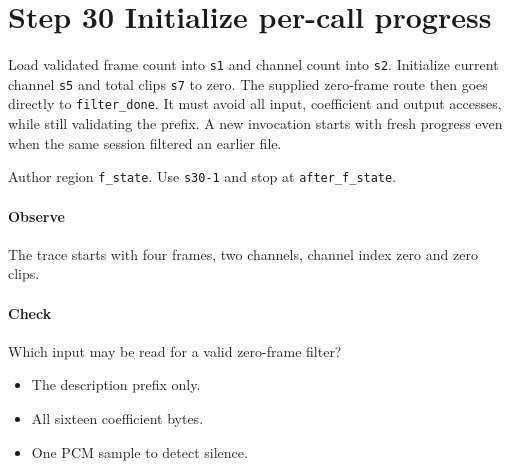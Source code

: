 \section{Step 30 Initialize per-call progress}\label{pcm-wav-s30}
Load validated frame count into \texttt{s1} and channel count into \texttt{s2}. Initialize current channel \texttt{s5} and total clips \texttt{s7} to zero. The supplied zero-frame route then goes directly to \texttt{filter\_done}. It must avoid all input, coefficient and output accesses, while still validating the prefix. A new invocation starts with fresh progress even when the same session filtered an earlier file.

Author region \texttt{f\_state}. Use \texttt{s30-1} and stop at \texttt{after\_f\_state}.

\paragraph{Observe} The trace starts with four frames, two channels, channel index zero and zero clips.

\paragraph{Check} Which input may be read for a valid zero-frame filter?
\begin{itemize}
  \item[A.] The description prefix only.
  \item[B.] All sixteen coefficient bytes.
  \item[C.] One PCM sample to detect silence.
\end{itemize}
